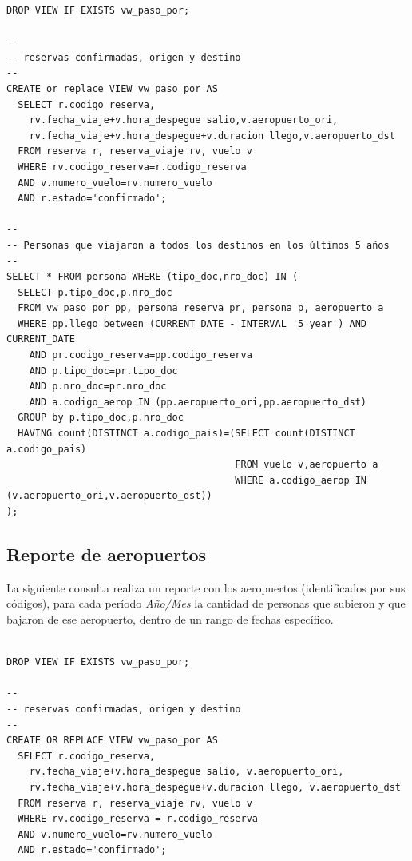 \documentclass[a4paper,10pt]{article}
\begin{document}
\begin{verbatim}
DROP VIEW IF EXISTS vw_paso_por;

--
-- reservas confirmadas, origen y destino
--
CREATE or replace VIEW vw_paso_por AS
  SELECT r.codigo_reserva,
    rv.fecha_viaje+v.hora_despegue salio,v.aeropuerto_ori,
    rv.fecha_viaje+v.hora_despegue+v.duracion llego,v.aeropuerto_dst
  FROM reserva r, reserva_viaje rv, vuelo v
  WHERE rv.codigo_reserva=r.codigo_reserva
  AND v.numero_vuelo=rv.numero_vuelo
  AND r.estado='confirmado';

--
-- Personas que viajaron a todos los destinos en los últimos 5 años
--
SELECT * FROM persona WHERE (tipo_doc,nro_doc) IN (
  SELECT p.tipo_doc,p.nro_doc
  FROM vw_paso_por pp, persona_reserva pr, persona p, aeropuerto a
  WHERE pp.llego between (CURRENT_DATE - INTERVAL '5 year') AND CURRENT_DATE
    AND pr.codigo_reserva=pp.codigo_reserva
    AND p.tipo_doc=pr.tipo_doc
    AND p.nro_doc=pr.nro_doc
    AND a.codigo_aerop IN (pp.aeropuerto_ori,pp.aeropuerto_dst)
  GROUP by p.tipo_doc,p.nro_doc
  HAVING count(DISTINCT a.codigo_pais)=(SELECT count(DISTINCT a.codigo_pais)
                                        FROM vuelo v,aeropuerto a
                                        WHERE a.codigo_aerop IN (v.aeropuerto_ori,v.aeropuerto_dst))
);
\end{verbatim}


\subsection{Reporte de aeropuertos}

La siguiente consulta realiza un reporte con los aeropuertos (identificados por sus códigos), para cada período \textit{Año/Mes} la cantidad de personas que subieron y que bajaron de ese aeropuerto,
dentro de un rango de fechas específico.

\begin{verbatim}
 
DROP VIEW IF EXISTS vw_paso_por;

--
-- reservas confirmadas, origen y destino
--
CREATE OR REPLACE VIEW vw_paso_por AS
  SELECT r.codigo_reserva,
    rv.fecha_viaje+v.hora_despegue salio, v.aeropuerto_ori,
    rv.fecha_viaje+v.hora_despegue+v.duracion llego, v.aeropuerto_dst
  FROM reserva r, reserva_viaje rv, vuelo v
  WHERE rv.codigo_reserva = r.codigo_reserva
  AND v.numero_vuelo=rv.numero_vuelo
  AND r.estado='confirmado';
  
\end{verbatim}
\end{document}
